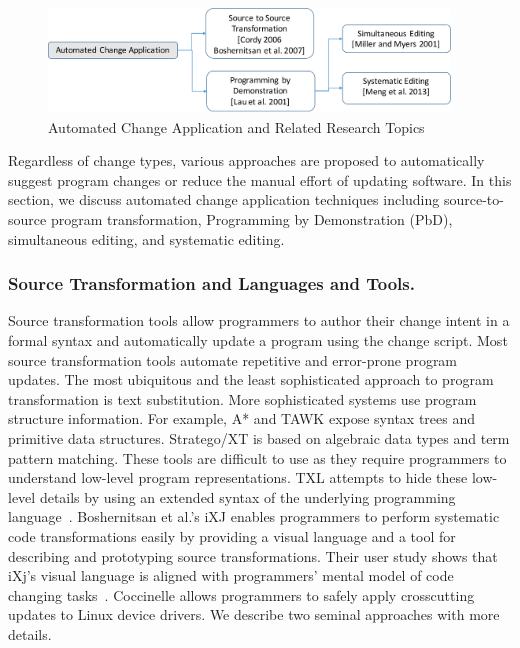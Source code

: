 
\begin{figure}[ht]
 \centering
 \includegraphics[width=0.95\textwidth]{images/AutomatedChange.pdf}
 \caption{Automated Change Application and Related Research Topics} 
 \label{fig:automaticapplication} 
\end{figure}


Regardless of change types, various approaches are proposed to automatically suggest program changes or reduce the manual effort of updating software. In this section, we discuss automated change application techniques including source-to-source program transformation, Programming by Demonstration (PbD), simultaneous editing, and systematic editing.

\subsubsection{Source Transformation and Languages and Tools.} 

Source transformation tools allow programmers to author their change intent in a formal syntax and automatically update a program using the change script. Most source transformation tools automate repetitive and error-prone program updates. The most ubiquitous and the least sophisticated approach to program transformation is text substitution. More sophisticated systems use program structure information. For example, A* \cite{Ladd1995} and TAWK \cite{Griswold1996} expose syntax trees and primitive data structures. Stratego/XT is based on algebraic data types and term pattern matching\cite{Visser2004}. These tools are difficult to use as they require programmers to understand low-level program representations. TXL attempts to hide these low-level details by using an extended syntax of the underlying programming language~\cite{Cordy2006}. Boshernitsan et al.'s iXJ enables programmers to perform systematic code transformations easily by providing a visual language and a tool for describing and prototyping source transformations. Their user study shows that iXj's visual language is aligned with programmers' mental model of code changing tasks~\cite{Boshernitsan2007}. Coccinelle \cite{Padioleau2008:auto} allows programmers to safely apply crosscutting updates to Linux device drivers. We describe two seminal approaches with more details. 

